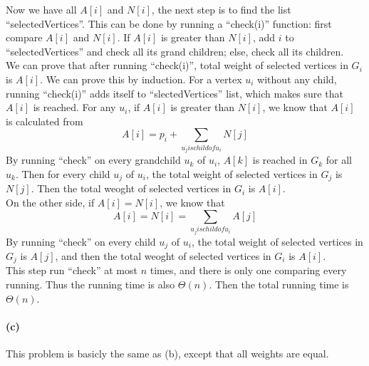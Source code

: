 \documentclass{6046}
\begin{document}
Now we have all $A[i]$ and $N[i]$, the next step is to find the list ``selectedVertices''. 
This can be done by running a ``check(i)'' function: 
first compare $A[i]$ and $N[i]$. 
If $A[i]$ is greater than $N[i]$, add $i$ to ``selectedVertices'' and check all its grand children; 
else, check all its children. 
\\
We can prove that after running ``check(i)'', 
total weight of selected vertices in $G_i$ is $A[i]$.
We can prove this by induction. 
For a vertex $u_i$ without any child, running ``check(i)'' 
adds itself to ``slectedVertices'' list, which makes sure that $A[i]$ is reached. 
For any $u_i$, if $A[i]$ is greater than $N[i]$, 
we know that $A[i]$ is calculated from 
$$A[i] = p_i + \sum_{u_j is child of u_i}N[j]$$
By running ``check'' on every grandchild $u_k$ of $u_i$, 
$A[k]$ is reached in $G_k$ for all $u_k$. 
Then for every child $u_j$ of $u_i$, the total weight of selected vertices in $G_j$ is 
$N[j]$. 
Then the total weoght of selected vertices in $G_i$ is $A[i]$. 
\\
On the other side, if $A[i] = N[i]$, 
we know that 
$$A[i] = N[i] = \sum_{u_j is child of u_i} A[j]$$
By running ``check'' on every child $u_j$ of $u_i$, 
the total weight of selected vertices in $G_j$ is $A[j]$, and 
then the total weoght of selected vertices in $G_i$ is $A[i]$. 
\\
This step run ``check'' at most $n$ times, and there is only one comparing every running. 
Thus the running time is also $\Theta(n)$. 
Then the total running time is $\Theta(n)$. 



\paragraph{(c)}
This problem is basicly the same as (b), 
except that all weights are equal. 
\\
\end{document}
